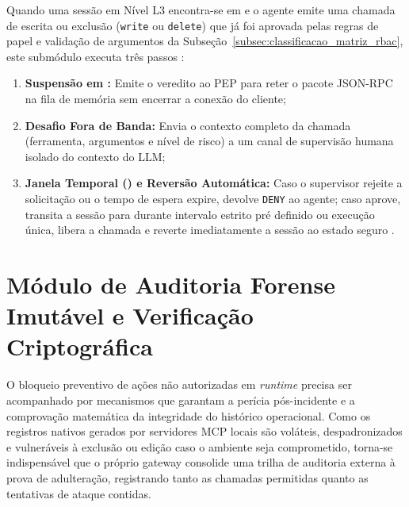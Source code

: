 Quando uma sessão em Nível L3 encontra-se em  e o agente emite uma chamada  de escrita ou exclusão (\texttt{write} ou \texttt{delete}) que já foi aprovada pelas regras de papel e validação de argumentos da Subseção~\ref{subsec:classificacao_matriz_rbac}, este submódulo executa três passos \cite{singh2026mcpsecure,hou2025mcp}:
\begin{enumerate}
  \item \textbf{Suspensão em :} Emite o veredito  ao PEP para reter o pacote JSON-RPC na fila de memória sem encerrar a conexão do cliente;
  \item \textbf{Desafio Fora de Banda:} Envia o contexto completo da chamada (ferramenta, argumentos e nível de risco) a um canal de supervisão humana isolado do contexto do LLM;
  \item \textbf{Janela Temporal () e Reversão Automática:} Caso o supervisor rejeite a solicitação ou o tempo de espera expire, devolve \texttt{DENY} ao agente; caso aprove, transita a sessão para  durante intervalo estrito pré definido ou execução única, libera a chamada e reverte imediatamente a sessão ao estado seguro .
\end{enumerate}

\section{Módulo de Auditoria Forense Imutável e Verificação Criptográfica}
\label{sec:modulo_auditoria_forense}

O bloqueio preventivo de ações não autorizadas em \textit{runtime} precisa ser acompanhado por mecanismos que garantam a perícia pós-incidente e a comprovação matemática da integridade do histórico operacional. Como os registros nativos gerados por servidores MCP locais são voláteis, despadronizados e vulneráveis à exclusão ou edição caso o ambiente seja comprometido, torna-se indispensável que o próprio gateway consolide uma trilha de auditoria externa à prova de adulteração, registrando tanto as chamadas permitidas quanto as tentativas de ataque contidas.

